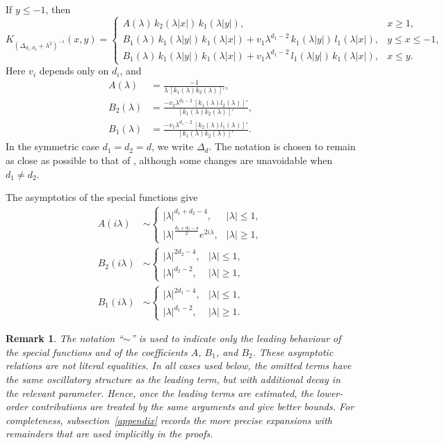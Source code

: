 \documentclass[12pt]{amsart}
\newcommand\Lapd{\Delta_{d_1, d_2}}
\newcommand\Lapdd{\Delta_{d}}
\newtheorem{remark}[theorem]{Remark}
\begin{document}
If $y \le -1$, then
\begin{equation}\label{eq_y<1}
K_{(\Lapd + \lambda^2)^{-1}}(x,y)
=
\begin{cases}
A(\lambda)\, k_2(\lambda|x|)\, k_1(\lambda|y|), & x \ge 1,\\[2mm]
B_1(\lambda)\, k_1(\lambda|y|)\, k_1(\lambda|x|)
+ v_1 \lambda^{d_1-2}\, k_1(\lambda|y|)\, l_1(\lambda|x|), & y \le x \le -1,\\[2mm]
B_1(\lambda)\, k_1(\lambda|y|)\, k_1(\lambda|x|)
+ v_1 \lambda^{d_1-2}\, l_1(\lambda|y|)\, k_1(\lambda|x|), & x \le y.
\end{cases}
\end{equation}
Here $v_i$ depends only on $d_i$, and
\begin{align*}
A(\lambda) &= \frac{-1}{\lambda \,[k_1(\lambda) k_2(\lambda)]'},\\
B_2(\lambda) &= \frac{-v_2 \lambda^{d_2-2}\,[k_1(\lambda) l_2(\lambda)]'}
{[k_1(\lambda) k_2(\lambda)]'},\\
B_1(\lambda) &= \frac{-v_1 \lambda^{d_1-2}\,[k_2(\lambda) l_1(\lambda)]'}
{[k_1(\lambda) k_2(\lambda)]'}.
\end{align*}
In the symmetric case $d_1=d_2=d$, we write $\Lapdd$. The notation is chosen
to remain as close as possible to that of \cite{HS1D}, although some changes are
unavoidable when $d_1\neq d_2$.

The asymptotics of the special functions give
\begin{align*}
A(i\lambda) &\sim
\begin{cases}
|\lambda|^{d_1+d_2-4}, & |\lambda| \le 1,\\
|\lambda|^{\frac{d_1+d_2-4}{2}} e^{2i\lambda}, & |\lambda| \ge 1,
\end{cases}\\
B_2(i\lambda) &\sim
\begin{cases}
|\lambda|^{2d_2-4}, & |\lambda| \le 1,\\
|\lambda|^{d_2-2}, & |\lambda| \ge 1,
\end{cases}\\
B_1(i\lambda) &\sim
\begin{cases}
|\lambda|^{2d_1-4}, & |\lambda| \le 1,\\
|\lambda|^{d_1-2}, & |\lambda| \ge 1.
\end{cases}
\end{align*}





\begin{remark}
The notation ``$\sim$'' is used to indicate only the leading behaviour of the
special functions and of the coefficients $A$, $B_1$, and $B_2$. These
asymptotic relations are not literal equalities. In all cases used below, the
omitted terms have the same oscillatory structure as the leading term, but with
additional decay in the relevant parameter. Hence, once the leading terms are
estimated, the lower-order contributions are treated by the same arguments and
give better bounds. For completeness, subsection~\ref{appendix} 
records the more
precise expansions with remainders that are used implicitly in the proofs.
\end{remark}
\end{document}
